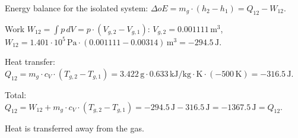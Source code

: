 Energy balance for the isolated system:  
\( \Delta oE = m_g \cdot (h_2 - h_1) = Q_{12} - W_{12} \).  

Work \( W_{12} = \int p \, dV = p \cdot (V_{g,2} - V_{g,1}) \):  
\( V_{g,2} = 0.001111 \, \text{m}^3 \),  
\( W_{12} = 1.401 \cdot 10^5 \, \text{Pa} \cdot (0.001111 - 0.00314) \, \text{m}^3 = -294.5 \, \text{J} \).  

Heat transfer:  
\( Q_{12} = m_g \cdot c_V \cdot (T_{g,2} - T_{g,1}) = 3.422 \, \text{g} \cdot 0.633 \, \text{kJ}/\text{kg} \cdot \text{K} \cdot (-500 \, \text{K}) = -316.5 \, \text{J} \).  

Total:  
\( Q_{12} = W_{12} + m_g \cdot c_V \cdot (T_{g,2} - T_{g,1}) = -294.5 \, \text{J} - 316.5 \, \text{J} = -1367.5 \, \text{J} = Q_{12} \).  

Heat is transferred away from the gas.